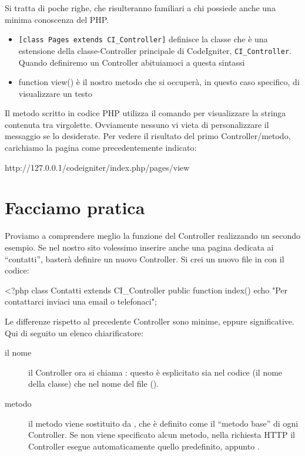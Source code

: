 Si tratta di poche righe, che risulteranno familiari a chi possiede anche una minima conoscenza del \ac{PHP}.

\begin{itemize}
\item \verb|[class Pages extends CI_Controller]| definisce la classe  che è una estensione della classe-Controller principale di CodeIgniter, \verb|CI_Controller|. Quando definiremo un Controller abituiamoci a questa sintassi
\item function view() è il nostro metodo che si occuperà, in questo caso specifico, di visualizzare un testo
\end{itemize}

Il metodo  scritto in codice \ac{PHP} utilizza il comando  per visualizzare la stringa contenuta tra virgolette. Ovviamente nessuno vi vieta di personalizzare il messaggio se lo desiderate. Per vedere il risultato del primo Controller/metodo, carichiamo la pagina come precedentemente indicato:

\begin{code}
http://127.0.0.1/codeigniter/index.php/pages/view
\end{code}

\section*{Facciamo pratica}
Proviamo a comprendere meglio la funzione del Controller realizzando un secondo esempio. Se nel nostro sito volessimo inserire anche una pagina dedicata ai ``contatti'', basterà definire un nuovo Controller. Si crei un nuovo file  in  con il codice:                        

\begin{code}
<?php
class Contatti extends CI_Controller {
	public function index()
	{
		echo "Per contattarci inviaci una email o telefonaci";
	}
}
\end{code}

Le differenze rispetto al precedente Controller sono minime, eppure significative. Qui di seguito un elenco chiarificatore:
  
\begin{description}
\item[il nome] il Controller ora si chiama : questo è esplicitato sia nel codice (il nome della classe) che nel nome del file ().
\item[metodo] il metodo  viene sostituito da , che è definito come il ``metodo base'' di ogni Controller. Se non viene specificato alcun metodo, nella richiesta \ac{HTTP} il Controller esegue automaticamente quello predefinito, appunto .
\end{description}

